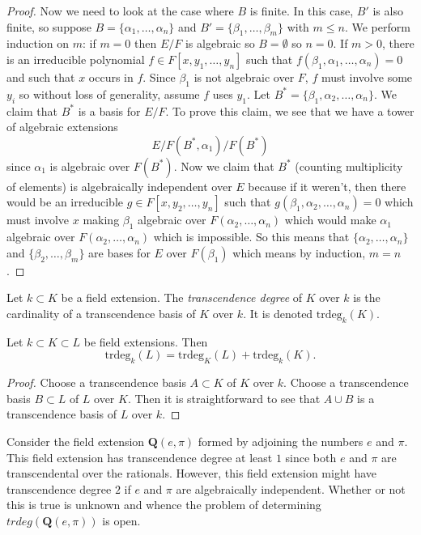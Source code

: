 \begin{proof}
\medskip\noindent
Now we need to look at the case where $B$ is finite.
In this case, $B'$ is also finite, so suppose
$B = \{\alpha_1, \ldots, \alpha_n\}$ and
$B' = \{\beta_1, \ldots, \beta_m\}$ with $m \leq n$.
We perform induction on $m$: if $m = 0$ then $E/F$ is algebraic so
$B = \emptyset$ so $n = 0$. If $m > 0$, there is an irreducible polynomial
$f \in F[x, y_1, \ldots, y_n]$ such that
$f(\beta_1, \alpha_1, \ldots, \alpha_n) = 0$ and such that $x$ occurs in $f$.
Since $\beta_1$ is not algebraic over $F$, $f$ must involve some $y_i$
so without loss of generality, assume $f$ uses $y_1$.
Let $B^* = \{\beta_1, \alpha_2, \ldots, \alpha_n\}$.
We claim that $B^*$ is a basis for $E/F$. To prove this claim, we see that
we have a tower of algebraic extensions
$$
E/ F(B^*, \alpha_1) / F(B^*)
$$
since $\alpha_1$ is algebraic over $F(B^*)$.
Now we claim that $B^*$ (counting multiplicity of elements) is
algebraically independent over $E$ because if it weren't, then there would be an
irreducible $g\in F[x, y_2, \ldots, y_n]$ such that
$g(\beta_1, \alpha_2, \ldots, \alpha_n) = 0$
which must involve $x$ making $\beta_1$
algebraic over $F(\alpha_2, \ldots, \alpha_n)$ which would make $\alpha_1$
algebraic over $F(\alpha_2, \ldots, \alpha_n)$ which is impossible.
So this means that $\{\alpha_2, \ldots, \alpha_n\}$ and
$\{\beta_2, \ldots, \beta_m\}$ are bases for $E$ over $F(\beta_1)$
which means by induction, $m = n$.
\end{proof}

\begin{definition}
\label{definition-transcendence-degree}
Let $k \subset K$ be a field extension.
The {\it transcendence degree} of $K$ over $k$ is
the cardinality of a transcendence basis of $K$ over $k$.
It is denoted $\text{trdeg}_k(K)$.
\end{definition}

\begin{lemma}
\label{lemma-transcendence-degree-tower}
Let $k \subset K \subset L$ be field extensions.
Then
$$
\text{trdeg}_k(L) =
\text{trdeg}_K(L) +
\text{trdeg}_k(K).
$$
\end{lemma}

\begin{proof}
Choose a transcendence basis $A \subset K$ of $K$ over $k$.
Choose a transcendence basis $B \subset L$ of $L$ over $K$.
Then it is straightforward to see that $A \cup B$ is a transcendence
basis of $L$ over $k$.
\end{proof}

\begin{example}
\label{example-pi-e-transcendental}
Consider the field extension $\mathbf{Q}(e, \pi)$ formed by
adjoining the numbers $e$ and $\pi$. This field extension has transcendence
degree at least $1$ since both $e$ and $\pi$ are transcendental over the
rationals. However, this field extension might have transcendence
degree $2$ if $e$ and $\pi$ are algebraically independent. Whether or
not this is true is unknown and whence the problem of determining
$trdeg(\mathbf{Q}(e, \pi))$ is open.
\end{example}

